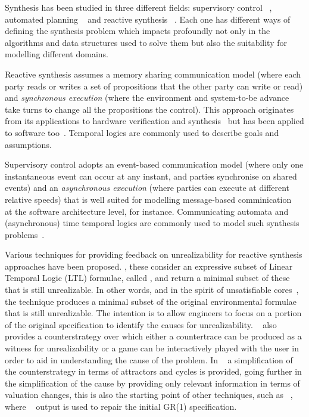 Synthesis has been studied in three different fields: supervisory control 
~\cite{ramadge:1989}, automated planning ~\cite{CITA MAS ANTIGUA NO DE FOND 
PLANNING daniele:2000} and reactive synthesis ~\cite{Maoz:2014,Bloem:2012, 
CITAFUNDACIONAL}.  Each one has different ways of defining the synthesis problem 
which impacts profoundly not only in the algorithms and data structures used to solve 
them but also the suitability for modelling different domains. 

Reactive 
synthesis assumes   a memory sharing  communication model (where each party reads 
or writes a set of propositions that the other party can write or read) and 
\textit{synchronous execution} (where the environment and system-to-be advance 
take turns to change all the propositions the control). This approach 
originates from its applications to hardware verification and synthesis~\cite{} but has 
been applied to software too~\cite{}. Temporal logics 
are commonly used to describe goals and assumptions. 

Supervisory control adopts an event-based communication model (where only one 
instantaneous event can occur at any instant, and parties synchronise on shared 
events) and an \textit{asynchronous execution} (where parties can execute at 
different relative speeds) that is well suited for modelling message-based 
comminication~\cite{Hoare, Milner} at the software architecture level, for instance. 
Communicating automata  and (asynchronous) time temporal logics are commonly used 
to model such synthesis problems~\cite{incluir supervisory control aca}. 

Various techniques for providing feedback on unrealizability for reactive synthesis 
approaches have been proposed. \cite{DBLP:conf/fmcad/KonighoferHB09, 
DBLP:journals/scp/Schuppan12,DBLP:conf/fmcad/AlurMT13,maoz2021unrealizable},
these consider an expressive subset of Linear Temporal 
Logic (LTL) formulae, called \gr, and return a minimal subset of these that is still 
unrealizable. In other words, and in the spirit of unsatisfiable cores~\cite{Torlak:2008}, 
the technique produces a minimal subset of the original environmental formulae that is 
still unrealizable. The intention is to allow engineers to focus on a portion of the original 
specification to identify the causes for unrealizability. 
~\cite{DBLP:conf/fmcad/KonighoferHB09} also provides a counterstrategy over which 
either a countertrace can be produced as a witness for unrealizability or a game can be 
interactively played with the user in order to aid in understanding the cause of the 
problem. In ~\cite{DBLP:conf/sigsoft/KuventMR17} a simplification of the 
counterstrategy in terms of attractors and cycles is provided, going further in the 
simplification of the cause by providing only relevant information in terms of valuation 
changes, this is also the starting point of other techniques, such as 
~\cite{maoz2019symbolic}, where ~\cite{DBLP:conf/sigsoft/KuventMR17} output is 
used to repair the initial GR(1) specification.



